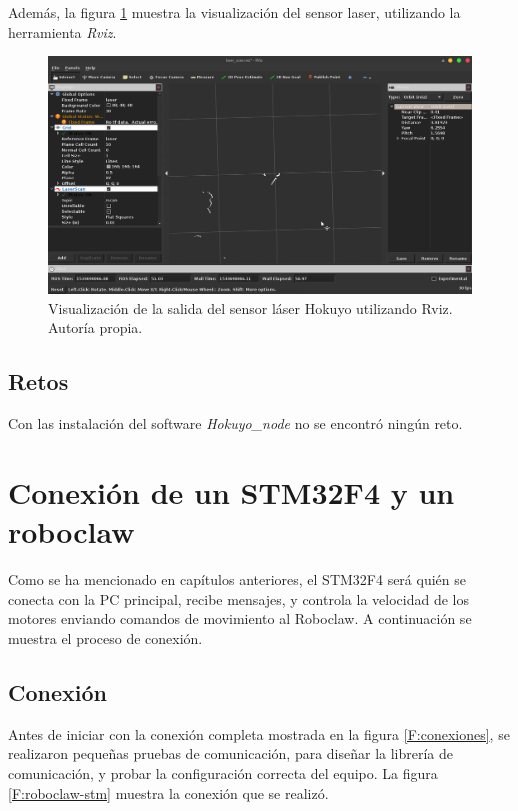 Además, la figura \ref{F:hokuyorviz} muestra la visualización del sensor laser, utilizando la herramienta \textit{Rviz}.

\begin{figure}[h!]
\centering
\includegraphics[scale=0.34]{imagenes/hokuyorviz.png}
\caption{Visualización de la salida del sensor láser Hokuyo utilizando Rviz. Autoría propia. }
\label{F:hokuyorviz}
\end{figure}

\subsection{Retos}

Con las instalación del software \textit{Hokuyo\_node} no se encontró ningún reto.

\section{Conexión de un STM32F4 y un roboclaw}

Como se ha mencionado en capítulos anteriores, el STM32F4 será quién se conecta con la PC principal, recibe mensajes, y controla la velocidad de los motores enviando comandos de movimiento al Roboclaw. A continuación se muestra el proceso de conexión.

\subsection{Conexión}

Antes de iniciar con la conexión completa mostrada en la figura \ref{F:conexiones}, se realizaron pequeñas pruebas de comunicación, para diseñar la librería de comunicación, y probar la configuración correcta del equipo. La figura \ref{F:roboclaw-stm} muestra la conexión que se realizó.

